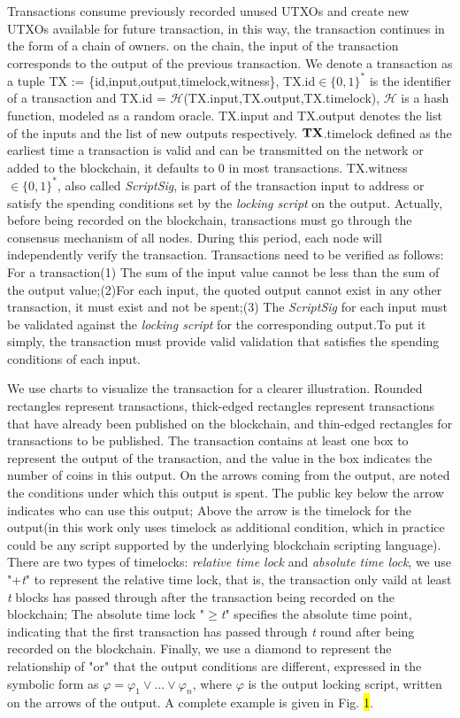 \documentclass[conference]{IEEEtran}
\begin{document}
Transactions consume previously recorded unused UTXOs and create new UTXOs available for future transaction, in this 
way, the transaction continues in the form of a chain of owners. on the chain, the input of the transaction corresponds 
to the output of the previous transaction. We denote a transaction as a tuple TX := \{id,input,output,timelock,witness\}, 
TX.id$\in\{0,1\}^*$ is the identifier of a transaction and TX.id = $\mathcal H$(TX.input,TX.output,TX.timelock), $\mathcal H$ 
is a hash function, modeled as a random oracle. TX.input and TX.output denotes the list of the inputs and the list of 
new outputs respectively. $\bf TX$.timelock defined as the earliest time a transaction is valid and can be transmitted 
on the network or added to the blockchain, it defaults to 0 in most transactions. TX.witness$\in\{0,1\}^*$, also 
called \emph{ScriptSig}, is part of the transaction input to address or satisfy the spending conditions set by the 
\emph{locking script} on the output. Actually, before being recorded on the blockchain, transactions must go through 
the consensus mechanism of all nodes. During this period, each node will independently verify the transaction. 
Transactions need to be verified as follows: For a transaction(1) The sum of the input value cannot be less 
than the sum of the output value;(2)For each input, the quoted output cannot exist in any other transaction, 
it must exist and not be spent;(3) The \emph{ScriptSig} for each input must be validated against the \emph{locking script} 
for the corresponding output.To put it simply, the transaction must provide valid validation that satisfies the spending 
conditions of each input.

We use charts to visualize the transaction for a clearer illustration. Rounded rectangles represent transactions, 
thick-edged rectangles represent transactions that have already been published on the blockchain, and thin-edged 
rectangles for transactions to be published. The transaction contains at least one box to represent the output 
of the transaction, and the value in the box indicates the number of coins in this output. On the arrows coming 
from the output, are noted the conditions under which this output is spent. The public key below the arrow indicates 
who can use this output; Above the arrow is the timelock for the output(in this work only uses timelock as additional 
condition, which in practice could be any script supported by the underlying blockchain scripting language). There 
are two types of timelocks: \emph{relative time lock} and \emph{absolute time lock}, we use "+\emph{t}" to represent 
the relative time lock, that is, the transaction only vaild at least \emph{t} blocks has passed through after the 
transaction being recorded on the blockchain; The absolute time lock "$\geq$\emph{t}" specifies the absolute time point, 
indicating that the first transaction has passed through \emph{t} round after being recorded on the blockchain. Finally, 
we use a diamond to represent the relationship of "or" that the output conditions are different, expressed in the symbolic 
form as $\varphi = \varphi_1 \vee ...\vee \varphi_n$, where $\varphi$ is the output locking script, written on the arrows 
of the output. A complete example is given in Fig. \colorbox{yellow}{1}.
\end{document}
